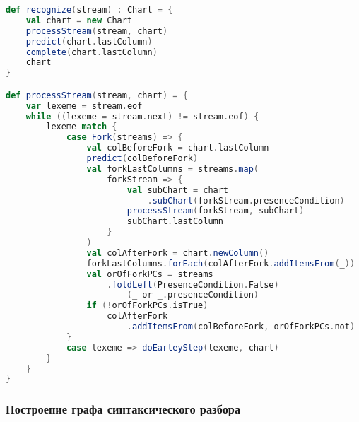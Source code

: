 \begin{minipage}{\linewidth}
\begin{lstlisting}[caption={Псевдокод алгоритма распознавания},language=Scala,label=recognitionpseudocode]
def recognize(stream) : Chart = {
	val chart = new Chart
	processStream(stream, chart)
	predict(chart.lastColumn)
	complete(chart.lastColumn)
	chart
}

def processStream(stream, chart) = {
	var lexeme = stream.eof
	while ((lexeme = stream.next) != stream.eof) {
		lexeme match {
			case Fork(streams) => {
				val colBeforeFork = chart.lastColumn
				predict(colBeforeFork)
				val forkLastColumns = streams.map(
					forkStream => {
						val subChart = chart
							.subChart(forkStream.presenceCondition)
						processStream(forkStream, subChart)
						subChart.lastColumn
					}
				)
				val colAfterFork = chart.newColumn()
				forkLastColumns.forEach(colAfterFork.addItemsFrom(_))
				val orOfForkPCs = streams
					.foldLeft(PresenceCondition.False) 
						(_ or _.presenceCondition)
				if (!orOfForkPCs.isTrue) 
					colAfterFork
						.addItemsFrom(colBeforeFork, orOfForkPCs.not)
			}
			case lexeme => doEarleyStep(lexeme, chart)
		}
	}
}
\end{lstlisting}
\end{minipage}

\subsubsection{Построение графа синтаксического разбора}


